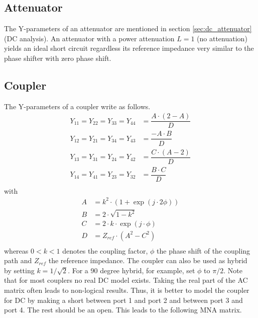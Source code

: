 \subsection{Attenuator}

The Y-parameters of an attenuator are mentioned in section
\ref{sec:dc_attenuator} (DC analysis).  An attenuator with a power attenuation
$L=1$ (no attenuation) yields an ideal short circuit regardless its
reference impedance very similar to the phase shifter with zero phase
shift.

\subsection{Coupler}

The Y-parameters of a coupler write as follows.
\begin{align}
Y_{11} = Y_{22} = Y_{33} = Y_{44} &= \dfrac{A\cdot \left(2-A\right)}{D} \\
Y_{12} = Y_{21} = Y_{34} = Y_{43} &= \dfrac{-A\cdot B}{D} \\
Y_{13} = Y_{31} = Y_{24} = Y_{42} &= \dfrac{C\cdot \left(A-2\right)}{D} \\
Y_{14} = Y_{41} = Y_{23} = Y_{32} &= \dfrac{B\cdot C}{D} \\
\end{align}
with
\begin{align}
A &= k^2 \cdot \left( 1+\exp\left(j\cdot 2\phi\right) \right) \\
B &= 2 \cdot \sqrt{1-k^2} \\
C &= 2 \cdot k \cdot \exp\left(j\cdot\phi\right) \\
D &= Z_{ref}\cdot \left(A^2 - C^2\right) \\
\end{align}
whereas $0<k<1$ denotes the coupling factor, $\phi$ the phase shift of
the coupling path and $Z_{ref}$ the reference impedance.  The coupler
can also be used as hybrid by setting $k=1/\sqrt{2}$.  For a 90 degree
hybrid, for example, set $\phi$ to $\pi / 2$.  Note that for most
couplers no real DC model exists.  Taking the real part of the AC
matrix often leads to non-logical results.  Thus, it is better to
model the coupler for DC by making a short between port 1 and port 2
and between port 3 and port 4.  The rest should be an open.  This
leads to the following MNA matrix.
